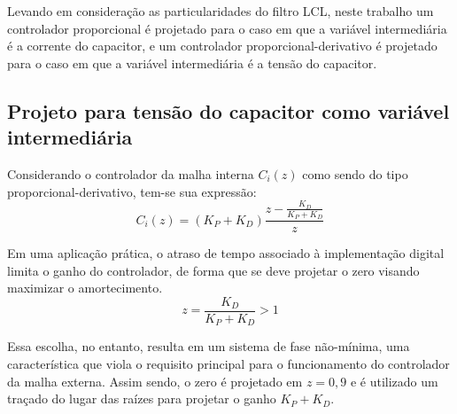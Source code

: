   Levando em consideração as particularidades do filtro LCL, neste trabalho um controlador proporcional é projetado para o caso em que a variável intermediária é a corrente do capacitor, e um controlador proporcional-derivativo é projetado para o caso em que a variável intermediária é a tensão do capacitor.


\subsection{Projeto para tensão do capacitor como variável intermediária}

  Considerando o controlador da malha interna $C_i(z)$ como sendo do tipo proporcional-derivativo, tem-se sua expressão:
  \begin{equation}
    C_i(z) = \left( K_P + K_D \right) \frac{z- \frac{K_D}{K_P+K_D}}{z}
  \end{equation}

  Em uma aplicação prática, o atraso de tempo associado à implementação digital limita o ganho do controlador, de forma que se deve projetar o zero visando maximizar o amortecimento.
  \begin{equation}
    z = \frac{K_D}{K_P+K_D} > 1
  \end{equation}

  Essa escolha, no entanto, resulta em um sistema de fase não-mínima, uma característica que viola o requisito principal para o funcionamento do controlador da malha externa. Assim sendo, o zero é projetado em $z=0,9$ e é utilizado um traçado do lugar das raízes para projetar o ganho $K_P+K_D$.

